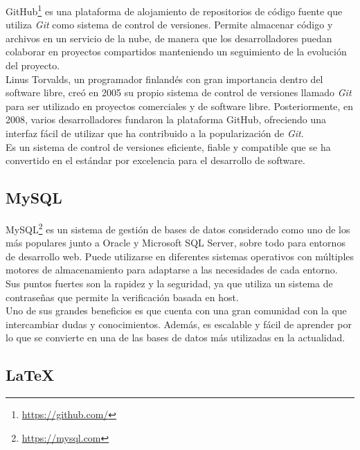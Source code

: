 \documentclass[a4paper, 12pt]{book}
\begin{document}
GitHub\footnote{\url{https://github.com/}} es una plataforma de alojamiento de repositorios de código fuente que utiliza \textit{Git} como sistema de control
de versiones. Permite almacenar código y archivos en un servicio de la nube, de manera que los desarrolladores puedan colaborar en proyectos compartidos
manteniendo un seguimiento de la evolución del proyecto.
\\Linus Torvalds, un programador finlandés con gran importancia dentro del software libre, creó en 2005 su propio sistema de control de versiones llamado \textit{Git} para ser utilizado
en proyectos comerciales y de software libre. Posteriormente, en 2008, varios desarrolladores fundaron la plataforma GitHub, ofreciendo una interfaz fácil de utilizar que ha contribuido a la
popularización de \textit{Git}.
\\Es un sistema de control de versiones eficiente, fiable y compatible que se ha convertido en el estándar por excelencia para el desarrollo de software.

\subsection{MySQL}
\label{subsec:mysql}

MySQL\footnote{\url{https://mysql.com}} es un sistema de gestión de bases de datos considerado como uno de los más populares junto a Oracle y Microsoft SQL Server, sobre todo para entornos de desarrollo web.
Puede utilizarse en diferentes sistemas operativos con múltiples motores de almacenamiento para adaptarse a las necesidades de cada entorno. Sus puntos fuertes son la rapidez y la seguridad, ya que utiliza un
sistema de contraseñas que permite la verificación basada en host.
\\Uno de sus grandes beneficios es que cuenta con una gran comunidad con la que intercambiar dudas y conocimientos. Además, es escalable y fácil de aprender por lo que se convierte en una de las bases de datos
más utilizadas en la actualidad.

\subsection{LaTeX}
\label{subsec:latex}
\end{document}
